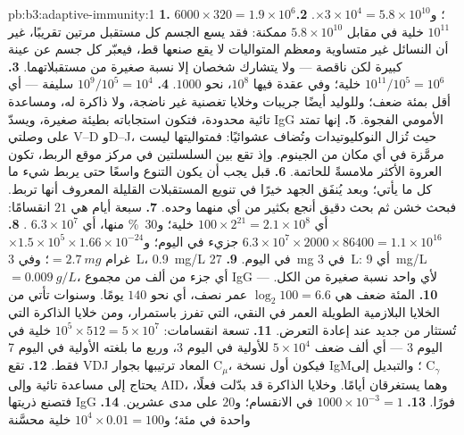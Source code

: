 \begin{solution}{pb:b3:adaptive-immunity:1}
\textbf{1.} $6000\times 320 = 1.9\times 10^{6}$؛ و$\times 3\times 10^{4}
= 5.8\times 10^{10}$.
\textbf{2.} $10^{11}$ خلية في مقابل $5.8\times 10^{10}$ ممكنة:
فقد يسع الجسم كل مستقبل مرتين تقريبًا، غير أن النسائل غير
متساوية ومعظم المتواليات لا يقع صنعها قط، فيعبّر كل جسم عن
عينة كبيرة لكن ناقصة --- ولا يتشارك شخصان إلا نسبة صغيرة من
مستقبلاتهما.
\textbf{3.} $10^{11}/10^{5} = 10^{6}$ خلية؛ وفي عقدة فيها $10^{8}$،
نحو $1000$.
\textbf{4.} $10^{9}/10^{5} = 10^{4}$ سليفة --- أي أقل بمئة ضعف؛
وللوليد أيضًا جريبات وخلايا تغصنية غير ناضجة، ولا ذاكرة له،
ومساعدة تائية محدودة، فتكون استجاباته بطيئة صغيرة، ويسدّ
IgG الأمومي الفجوة.
\textbf{5.} إنها تمتد على وصلتي V--D وD--J، حيث تُزال
النوكليوتيدات وتُضاف عشوائيًا: فمتواليتها ليست مرمَّزة في
أي مكان من الجينوم. وإذ تقع بين السلسلتين في مركز موقع
الربط، تكون العروة الأكثر ملامسةً للحاتمة.
\textbf{6.} قبل  يجب أن يكون التنوع واسعًا حتى يربط
شيء ما كل ما يأتي؛ وبعد  يُنفَق الجهد خيرًا في تنويع
المستقبلات القليلة المعروف أنها تربط. فبحث خشن ثم بحث دقيق
أنجع بكثير من أي منهما وحده.
\textbf{7.} سبعة أيام هي $21$ انقسامًا: أي $100\times 2^{21} = 2.1\times
10^{8}$ خلية؛ و\qty{30}{\%} منها، أي $6.3\times 10^{7}$ .
\textbf{8.} $6.3\times 10^{7}\times 2000\times \num{86400} = 1.1\times
10^{16}$ جزيء في اليوم؛ و$\times 1.5\times 10^{5}\times 1.66\times
10^{-24}$ غرام $= \qty{2.7}{mg}$؛ وفي \qty{3}{L}، \qty{0.9}{mg/L} في اليوم.
\textbf{9.} \qty{27}{mg} في \qty{3}{L}: أي \qty{9}{mg/L} $= \qty{0.009}{g/L}$،
أي جزء من ألف من مجموع IgG ---  لأي  واحد نسبة
صغيرة من الكل.
\textbf{10.} المئة ضعف هي $\log_{2}100 = 6.6$ عمر نصف، أي نحو
$140$ يومًا. وسنوات  تأتي من الخلايا البلازمية الطويلة
العمر في النقي، التي تفرز باستمرار، ومن خلايا الذاكرة التي
تُستثار من جديد عند إعادة التعرض.
\textbf{11.} تسعة انقسامات: $10^{5}\times 512 = 5\times 10^{7}$ خلية في
اليوم 3 --- أي ألف ضعف $5\times 10^{4}$ للأولية في اليوم 3،
وربع ما بلغته الأولية في اليوم 7 فقط.
\textbf{12.} تقع VDJ المعاد ترتيبها بجوار C$_{\mu}$، فيكون أول
نسخة IgM؛ والتبديل إلى C$_{\gamma}$ يحتاج إلى مساعدة تائية
وإلى AID، وهما يستغرقان أيامًا. وخلايا الذاكرة قد بدّلت
فعلًا، فتصنع ذريتها IgG فورًا.
\textbf{13.} $1000\times 10^{-3} = 1$ في الانقسام؛ و$20$ على مدى عشرين.
\textbf{14.} واحدة في مئة؛ و$10^{4}\times 0.01 = 100$ خلية محسَّنة

\end{solution}
